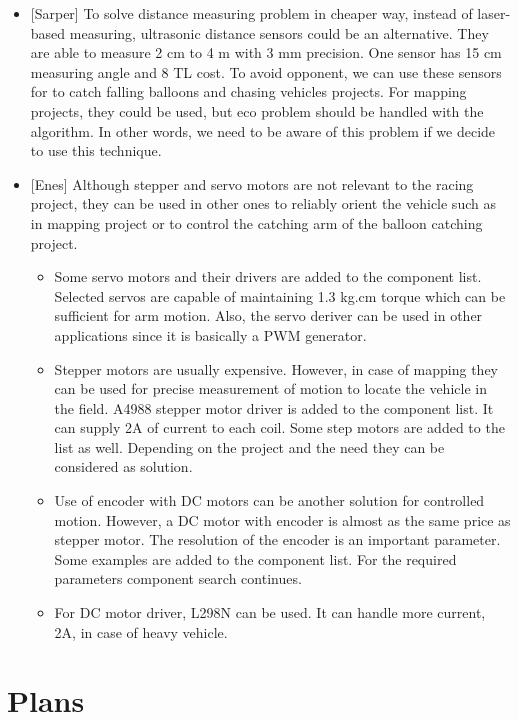 \documentclass[a4paper,12pt]{article}
\begin{document}
\begin{itemize}
	\item {[Sarper]} To solve distance measuring problem in cheaper way, instead of laser-based measuring, ultrasonic distance sensors could be an alternative. They are able to measure 2 cm to 4 m with 3 mm precision. One sensor has 15 cm measuring angle and 8 TL cost. To avoid opponent, we can use these sensors for to catch falling balloons and chasing vehicles projects. For mapping projects, they could be used, but eco problem should be handled with the algorithm. In other words, we need to be aware of this problem if we decide to use this technique. 
	\item {[Enes]} Although stepper and servo motors are not relevant to the racing project, they can be used in other ones to reliably orient the vehicle such as in mapping project or to control the catching arm of the balloon catching project.
	
	\begin{itemize}
		\item Some servo motors and their drivers are added to the component list. Selected servos are capable of maintaining 1.3 kg.cm torque which can be sufficient for arm motion. Also, the servo deriver can be used in other applications since it is basically a PWM generator.
		\item Stepper motors are usually expensive. However, in case of mapping they can be used for precise measurement of motion to locate the vehicle in the field. A4988 stepper motor driver is added to the component list. It can supply 2A of current to each coil. Some step motors are added to the list as well. Depending on the project and the need they can be considered as solution.
		\item Use of encoder with DC motors can be another solution for controlled motion. However, a DC motor with encoder is almost as the same price as stepper motor. The resolution of the encoder is an important parameter. Some examples are added to the component list. For the required parameters component search continues.
		\item For DC motor driver, L298N can be used. It can handle more current, 2A, in case of heavy vehicle.
	\end{itemize} 
	
	 
\end{itemize}

\section{Plans}
\end{document}
